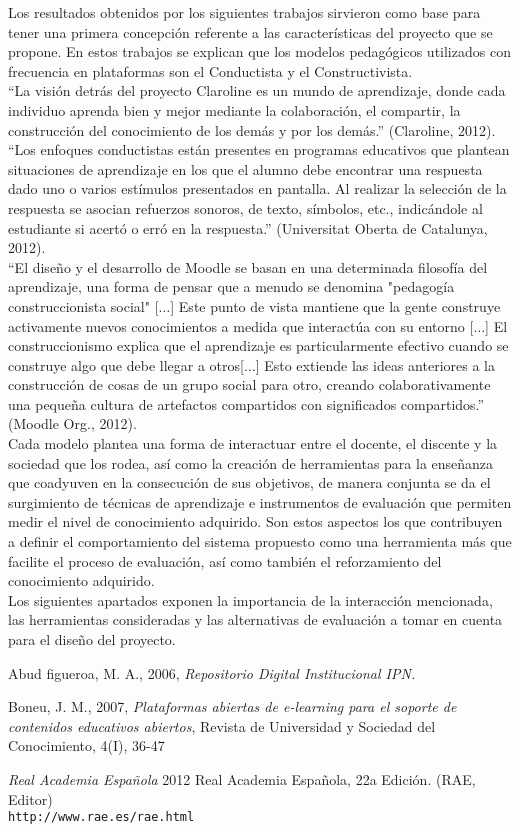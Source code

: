 \documentclass[12pt]{article} %
\begin{document}
Los resultados obtenidos por los siguientes trabajos sirvieron como base para tener una primera concepción referente a las características del proyecto que se propone. En estos trabajos se explican que los modelos pedagógicos utilizados con frecuencia en plataformas son el Conductista y el Constructivista.\\
“La visión detrás del proyecto Claroline es un mundo de aprendizaje, donde cada individuo aprenda bien y mejor mediante la colaboración, el compartir, la construcción del conocimiento de los demás y por los demás.” (Claroline, 2012).\\
“Los enfoques conductistas están presentes en programas educativos que plantean situaciones de aprendizaje en los que el alumno debe encontrar una respuesta dado uno o varios estímulos presentados en pantalla. Al realizar la selección de la respuesta se asocian refuerzos sonoros, de texto, símbolos, etc., indicándole al estudiante si acertó o erró en la respuesta.” (Universitat Oberta de Catalunya, 2012).\\
“El diseño y el desarrollo de Moodle se basan en una determinada filosofía del aprendizaje, una forma de pensar que a menudo se denomina "pedagogía construccionista social" [$\ldots$] Este punto de vista mantiene que la gente construye activamente nuevos conocimientos a medida que interactúa con su entorno [$\ldots$] El construccionismo explica que el aprendizaje es particularmente efectivo cuando se construye algo que debe llegar a otros[$\ldots$] Esto extiende las ideas anteriores a la construcción de cosas de un grupo social para otro, creando colaborativamente una pequeña cultura de artefactos compartidos con significados compartidos.” (Moodle Org., 2012).\\
Cada modelo plantea una forma de interactuar entre el docente, el discente y la sociedad que los rodea, así como la creación de herramientas para la enseñanza que coadyuven en la consecución de sus objetivos, de manera conjunta se da el surgimiento de técnicas de aprendizaje e instrumentos de evaluación que permiten medir el nivel de conocimiento adquirido. Son estos aspectos los que contribuyen a definir el comportamiento del sistema propuesto como una herramienta más que facilite el proceso de evaluación, así como también el reforzamiento del conocimiento adquirido.\\
Los siguientes apartados exponen la importancia de la interacción mencionada, las herramientas consideradas y las alternativas de evaluación a tomar en cuenta para el diseño del proyecto.

\begin{thebibliography}{2}
Abud figueroa, M. A.,
2006,
\textit{Repositorio Digital Institucional IPN.}

Boneu, J. M.,
2007,
\textit{Plataformas abiertas de e-learning para el soporte de contenidos educativos abiertos},
Revista de Universidad y Sociedad del Conocimiento, 4(I),
36-47

\textit{Real Academia Española}
2012
Real Academia Española, 22a Edición. (RAE, Editor) 
\\\texttt{http://www.rae.es/rae.html}
\end{thebibliography}
\end{document}
